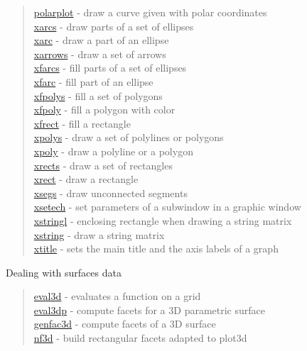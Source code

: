 \begin{quote}
\hyperlink{polarplot}{polarplot} - draw a curve given with polar coordinates \\
\hyperlink{xarcs}{xarcs} - draw parts of a set of ellipses \\
\hyperlink{xarc}{xarc} - draw a part of an ellipse\\
\hyperlink{xarrows}{xarrows} - draw a set of arrows \\
\hyperlink{xfarcs}{xfarcs} - fill parts of a set of ellipses \\
\hyperlink{xfarc}{xfarc} - fill part of an ellipse\\
\hyperlink{xfpolys}{xfpolys} - fill a set of polygons \\
\hyperlink{xfpoly}{xfpoly} - fill a polygon with color \\
\hyperlink{xfrect}{xfrect} - fill a rectangle \\
\hyperlink{xpolys}{xpolys} - draw a set of polylines or polygons \\
\hyperlink{xpoly}{xpoly} - draw a polyline or a polygon \\
\hyperlink{xrects}{xrects} - draw a set of rectangles\\
\hyperlink{xrect}{xrect} - draw a rectangle\\
\hyperlink{xsegs}{xsegs} - draw unconnected segments \\
\hyperlink{xsetech}{xsetech} - set parameters of a subwindow in a graphic window\\
\hyperlink{xstringl}{xstringl} - enclosing rectangle when drawing a string matrix \\
\hyperlink{xstring}{xstring} - draw a string matrix \\
\hyperlink{xtitle}{xtitle} - sets the main title and the axis labels of a graph\\
\end{quote}

Dealing with surfaces data
\begin{quote}
\noindent
\hyperlink{eval3d}{eval3d} - evaluates a function on a grid \\
\hyperlink{eval3dp}{eval3dp} - compute facets for a 3D parametric surface\\
\hyperlink{genfac3d}{genfac3d} - compute facets of a 3D surface\\
\hyperlink{nf3d}{nf3d} - build rectangular facets adapted to plot3d \\
\end{quote}

